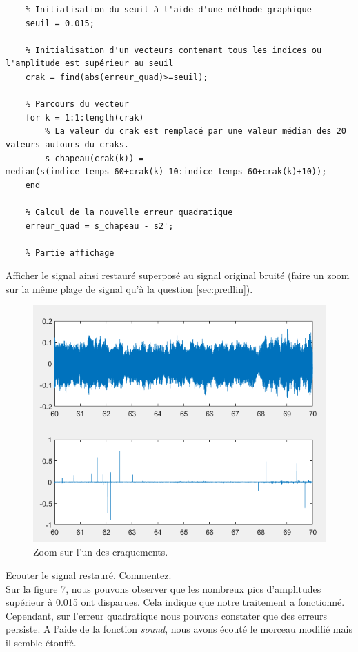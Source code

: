 \documentclass{article}
\begin{document}
\begin{verbatim}
    % Initialisation du seuil à l'aide d'une méthode graphique
    seuil = 0.015;
    
    % Initialisation d'un vecteurs contenant tous les indices ou l'amplitude est supérieur au seuil
    crak = find(abs(erreur_quad)>=seuil);
    
    % Parcours du vecteur 
    for k = 1:1:length(crak)
        % La valeur du crak est remplacé par une valeur médian des 20 valeurs autours du craks.
        s_chapeau(crak(k)) = median(s(indice_temps_60+crak(k)-10:indice_temps_60+crak(k)+10));
    end
    
    % Calcul de la nouvelle erreur quadratique 
    erreur_quad = s_chapeau - s2';
    
    % Partie affichage 
\end{verbatim}

Afficher le signal ainsi restauré  superposé au signal original bruité (faire un zoom sur la même plage de signal qu'à la question \ref{sec:predlin}).\\

\begin{figure}[!h]
    \centering
    \includegraphics[width=1\textwidth]{images/signalcraquement.png}
    \caption{Zoom sur l'un des craquements.}
    \label{fig-binaire}
\end{figure}


Ecouter le signal restauré. Commentez.\\
\newline
Sur la figure 7, nous pouvons observer que les nombreux pics d'amplitudes supérieur à 0.015 ont disparues. Cela indique que notre traitement a fonctionné. Cependant, sur l'erreur quadratique nous pouvons constater que des erreurs persiste. A l'aide de la fonction \textit{sound}, nous avons écouté le morceau modifié mais il semble étouffé. 
\clearpage
\end{document}
